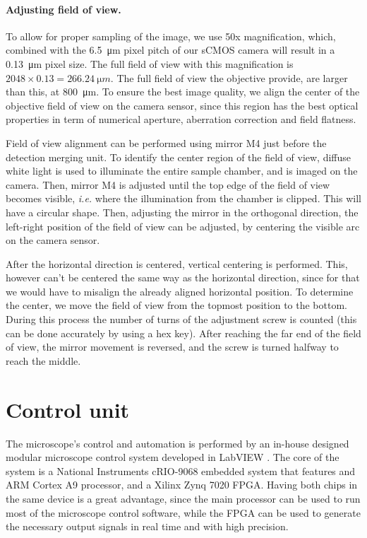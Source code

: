     \paragraph{Adjusting field of view.}
      To allow for proper sampling of the image, we use 50x magnification, which, combined with the \SI{6.5}{\micro m} pixel pitch of our sCMOS camera will result in a \SI{0.13}{\micro m} pixel size. The full field of view with this magnification is $2048 \times 0.13 = \SI{266.24}{\micro m}$. The full field of view the objective provide, are larger than this, at \SI{800}{\micro m}. To ensure the best image quality, we align the center of the objective field of view on the camera sensor, since this region has the best optical properties in term of numerical aperture, aberration correction and field flatness.

      Field of view alignment can be performed using mirror M4 just before the detection merging unit. To identify the center region of the field of view, diffuse white light is used to illuminate the entire sample chamber, and is imaged on the camera. Then, mirror M4 is adjusted until the top edge of the field of view becomes visible, \textit{i.e.} where the illumination from the chamber is clipped. This will have a circular shape. Then, adjusting the mirror in the orthogonal direction, the left-right position of the field of view can be adjusted, by centering the visible arc on the camera sensor.

      After the horizontal direction is centered, vertical centering is performed. This, however can't be centered the same way as the horizontal direction, since for that we would have to misalign the already aligned horizontal position. To determine the center, we move the field of view from the topmost position to the bottom. During this process the number of  turns of the adjustment screw is counted (this can be done accurately by using a hex key). After reaching the far end of the field of view, the mirror movement is reversed, and the screw is turned halfway to reach the middle.







\section{Control unit}

  The microscope's control and automation is performed by an in-house designed modular microscope control system developed in LabVIEW \cite{balazs_development_2013}. The core of the system is a National Instruments cRIO-9068 embedded system that features and ARM Cortex A9 processor, and a Xilinx Zynq 7020 FPGA.
  Having both chips in the same device is a great advantage, since the main processor can be used to run most of the microscope control software, while the FPGA can be used to generate the necessary output signals in real time and with high precision.
  
